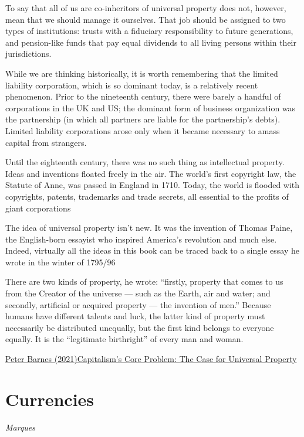\documentclass[
]{book}
\begin{document}
To say that all of us are co-inheritors of universal property does not, however, mean that we should manage it ourselves. That job should be assigned to two types of insti­tu­tions: trusts with a fiduciary respon­­­si­bility to future genera­tions, and pension-like funds that pay equal divi­dends to all living persons within their juris­di­ctions.

While we are thinking historically, it is worth remembering that the limited liability corporation, which is so dominant today, is a rela­tive­­ly recent phenomenon. Prior to the nineteenth century, there were barely a handful of corporations in the UK and US; the dominant form of busi­ness organization was the partnership (in which all partners are liable for the partnership's debts). Limited liability cor­por­­­a­tions arose only when it became necessary to amass capital from strangers.

Until the eighteenth century, there was no such thing as intel­lectual property. Ideas and inven­tions floated freely in the air. The world's first copyright law, the Statute of Anne, was passed in England in 1710. Today, the world is flooded with copy­rights, patents, trademarks and trade secrets, all essen­­tial to the profits of giant corporations

The idea of universal property isn't new. It was the invention of Thomas Paine, the English-born essayist who inspired Ameri­ca's revo­lution and much else. Indeed, virtually all the ideas in this book can be traced back to a single essay he wrote in the winter of 1795/96

There are two kinds of property, he wrote: ``firstly, property that comes to us from the Creator of the universe --- such as the Earth, air and water; and secondly, artificial or acquired property --- the inven­tion of men.'' Because humans have different talents and luck, the latter kind of property must necessarily be distributed unequally, but the first kind belongs to everyone equally. It is the ``legitimate birth­right'' of every man and woman.

\href{https://evonomics.com/a-new-capitalism-the-case-for-universal-property/}{Peter Barnes (2021)Capitalism's Core Problem: The Case for Universal Property}

\hypertarget{currencies}{%
\chapter{Currencies}\label{currencies}}

\emph{Marques}
\end{document}
